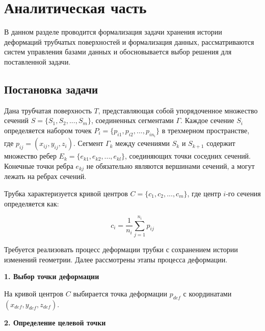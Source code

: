 \section{Аналитическая часть}

\noindent
\hspace{1.25cm}
В данном разделе проводится формализация задачи хранения истории деформаций трубчатых поверхностей и формализация данных, рассматриваются систем управления базами данных и обосновывается выбор решения для поставленной задачи.

\subsection{Постановка задачи}

\noindent
\hspace{1.25cm}
Дана трубчатая поверхность $T$, представляющая собой упорядоченное множество сечений $S = \{S_1, S_2, ..., S_m\}$, соединенных сегментами $\Gamma$. Каждое сечение $S_i$ определяется набором точек $P_i = \{p_{i1}, p_{i2}, ..., p_{in_i}\}$ в трехмерном пространстве, где $p_{ij} = (x_{ij}, y_{ij}, z_i)$. Сегмент $\Gamma_k$ между сечениями $S_k$ и $S_{k+1}$ содержит множество ребер $E_k = \{e_{k1}, e_{k2}, ..., e_{kl}\}$, соединяющих точки соседних сечений. Конечные точки ребра $e_{kj}$ не обязательно являются вершинами сечений, а могут лежать на ребрах сечений.

\noindent
\hspace{1.25cm}
Трубка характеризуется кривой центров $C = \{c_1, c_2, ..., c_m\}$, где центр $i$-го сечения определяется как:

\begin{equation}
c_i = \frac{1}{n_i} \sum_{j=1}^{n_i} p_{ij}
\end{equation}

\noindent
\hspace{1.25cm}
Требуется реализовать процесс деформации трубки с сохранением истории изменений геометрии. Далее рассмотрены этапы процесса деформации.

\noindent
\hspace{1.25cm}
\textbf{1. Выбор точки деформации}

\noindent
\hspace{1.25cm}
На кривой центров $C$ выбирается точка деформации $p_{def}$ с координатами $(x_{def}, y_{def}, z_{def})$.

\noindent
\hspace{1.25cm}
\textbf{2. Определение целевой точки}

